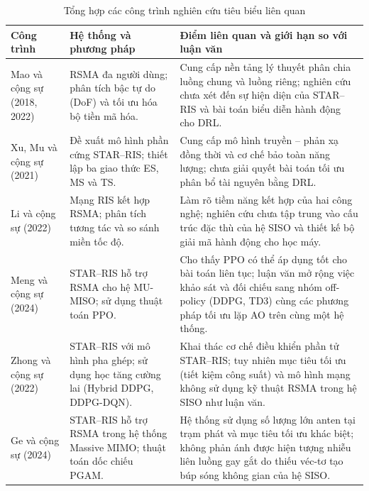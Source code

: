 \begin{table}[htbp]
\centering
\caption{Tổng hợp các công trình nghiên cứu tiêu biểu liên quan}
\label{tab:ch1-nghien-cuu}
\footnotesize
\begin{tabularx}{\textwidth}{@{}p{2.8cm} Y Y@{}}
\toprule
\textbf{Công trình} & \textbf{Hệ thống và phương pháp} & \textbf{Điểm liên quan và giới hạn so với luận văn} \\
\midrule
Mao và cộng sự (2018, 2022)~\cite{Mao2018RSMABridging, Mao2022RSMAFundamentals} & RSMA đa người dùng; phân
tích bậc tự do (DoF) và tối ưu hóa bộ tiền mã hóa. & Cung cấp nền tảng lý thuyết phân chia luồng chung và
luồng riêng; nghiên cứu chưa xét đến sự hiện diện của STAR--RIS và bài toán biểu diễn hành động cho DRL. \\
\addlinespace
Xu, Mu và cộng sự (2021)~\cite{Xu2021STARRIS, Mu2021STARAided} & Đề xuất mô hình phần cứng STAR--RIS; thiết
lập ba giao thức ES, MS và TS. & Cung cấp mô hình truyền -- phản xạ đồng thời và cơ chế bảo toàn năng lượng;
chưa giải quyết bài toán tối ưu phân bổ tài nguyên bằng DRL. \\
\addlinespace
Li và cộng sự (2022)~\cite{Li2022RSMARISInterplay} & Mạng RIS kết hợp RSMA; phân tích tương tác và so sánh
miền tốc độ. & Làm rõ tiềm năng kết hợp của hai công nghệ; nghiên cứu chưa tập trung vào cấu trúc đặc thù của
hệ SISO và thiết kế bộ giải mã hành động cho học máy. \\
\addlinespace
Meng và cộng sự (2024)~\cite{Meng2024PPOSTARRSMA} & STAR--RIS hỗ trợ RSMA cho hệ MU-MISO; sử dụng thuật
toán PPO. & Cho thấy PPO có thể áp dụng tốt cho bài toán liên tục; luận văn mở rộng việc khảo sát và đối
chiếu sang nhóm off-policy (DDPG, TD3) cùng các phương pháp tối ưu lặp AO trên cùng một hệ thống. \\
\addlinespace
Zhong và cộng sự (2022)~\cite{Zhong2022HybridRLSTAR} & STAR--RIS với mô hình pha ghép; sử dụng học tăng
cường lai (Hybrid DDPG, DDPG-DQN). & Khai thác cơ chế điều khiển phần tử STAR--RIS; tuy nhiên mục tiêu tối
ưu (tiết kiệm công suất) và mô hình mạng không sử dụng kỹ thuật RSMA trong hệ SISO như luận văn. \\
\addlinespace
Ge và cộng sự (2024)~\cite{Ge2024RSMAMassiveMIMO} & STAR--RIS hỗ trợ RSMA trong hệ thống Massive MIMO;
thuật toán dốc chiếu PGAM. & Hệ thống sử dụng số lượng lớn anten tại trạm phát và mục tiêu tối ưu khác
biệt; không phản ánh được hiện tượng nhiễu liên luồng gay gắt do thiếu véc-tơ tạo búp sóng không gian của
hệ SISO. \\
\bottomrule
\end{tabularx}
\end{table}

